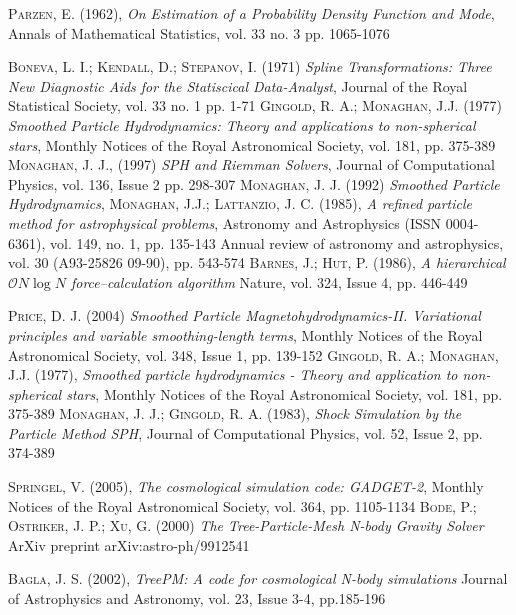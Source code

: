 \documentclass[a4paper,openright,12pt]{book}
\begin{document}
\begin{thebibliography}{a}
 \textsc{Parzen, E. (1962)},
\textit{On Estimation of a Probability Density Function and Mode},
Annals of Mathematical Statistics, vol. 33 no. 3 pp. 1065-1076

 \textsc{Boneva, L. I.; Kendall, D.; Stepanov, I. (1971)}
\textit{Spline Transformations: Three New Diagnostic Aids for the Statiscical Data-Analyst},
Journal of the Royal Statistical Society, vol. 33 no. 1 pp. 1-71
 \textsc{Gingold, R. A.; Monaghan, J.J. (1977)}
\textit{Smoothed Particle Hydrodynamics: Theory and applications to non-spherical stars},
Monthly Notices of the Royal Astronomical Society, vol. 181, pp. 375-389
 \textsc{Monaghan, J. J., (1997)}
\textit{SPH and Riemman Solvers},
Journal of Computational Physics, vol. 136, Issue 2 pp. 298-307 
 \textsc{Monaghan, J. J. (1992)}
\textit{Smoothed Particle Hydrodynamics},
 \textsc{Monaghan, J.J.; Lattanzio, J. C. (1985)},
\textit{A refined particle method for astrophysical problems},
Astronomy and Astrophysics (ISSN 0004-6361), vol. 149, no. 1, pp. 135-143
Annual review of astronomy and astrophysics, vol. 30 (A93-25826 09-90), pp. 543-574
 \textsc{Barnes, J.; Hut, P. (1986)},
\textit{A hierarchical $\mathcal{O}N\log N$ force--calculation algorithm}
Nature, vol. 324, Issue 4, pp. 446-449

 \textsc{Price, D. J. (2004)}
\textit{Smoothed Particle Magnetohydrodynamics-II. Variational principles and variable smoothing-length terms},
Monthly Notices of the Royal Astronomical Society, vol. 348, Issue 1, pp. 139-152
 \textsc{Gingold, R. A.; Monaghan, J.J. (1977)},
\textit{Smoothed particle hydrodynamics - Theory and application to non-spherical stars},
Monthly Notices of the Royal Astronomical Society, vol. 181, pp. 375-389
 \textsc{Monaghan, J. J.; Gingold, R. A. (1983)},
\textit{Shock Simulation by the Particle Method SPH},
Journal of Computational Physics, vol. 52, Issue 2, pp. 374-389

 \textsc{Springel, V. (2005)},
\textit{The cosmological simulation code: GADGET-2},
Monthly Notices of the Royal Astronomical Society, vol. 364, pp. 1105-1134
 \textsc{Bode, P.; Ostriker, J. P.; Xu, G. (2000)}
\textit{The Tree-Particle-Mesh N-body Gravity Solver}
ArXiv preprint arXiv:astro-ph/9912541 


 \textsc{Bagla, J. S. (2002)},
\textit{TreePM: A code for cosmological N-body simulations}
Journal of Astrophysics and Astronomy, vol. 23, Issue 3-4, pp.185-196


\end{thebibliography}
\end{document}
